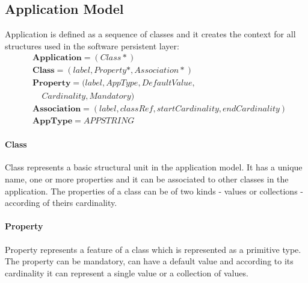 \documentclass[runningheads]{comsis}
\begin{document}


\subsection{Application Model}
Application is defined as a sequence of classes and it creates the context for all structures used in the software persistent layer:
\begin{align}
& \mathbf{Application} = (Class*) \\
& 	\mathbf{Class} = (label, Property*, Association*) \\
& \mathbf{Property} = (label, AppType, DefaultValue, \nonumber \\ & \;\;\;\;  Cardinality, Mandatory) \\
&	\mathbf{Association} = (label, classRef, startCardinality, endCardinality)  \\
& \mathbf{AppType} = APPSTRING
\end{align}

\paragraph{Class} Class represents a basic structural unit in the application model. It has a unique name, one or more properties and it can be associated to other classes in the application. The properties of a class can be of two kinds - values or collections - according of theirs cardinality.
	 
\paragraph{Property} Property represents a feature of a class which is represented as a primitive type. The property can be mandatory, can have a default value and according to its cardinality it can represent a single value or a collection of values. 
\end{document}
